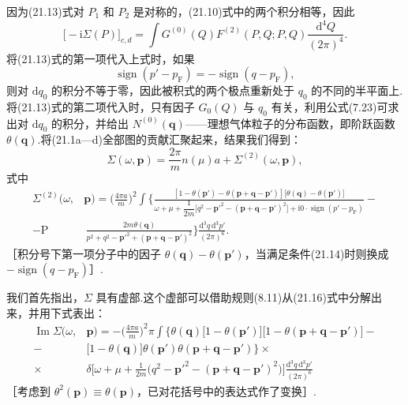 因为(21.13)式对 $P_1$ 和 $P_2$ 是对称的，(21.10)式中的两个积分相等，因此
\begin{equation*}
  \bigl[-\mathrm{i}\Sigma(P)\bigr]_{c,d}=\int G^{(0)}(Q)F^{(2)}(P,Q;P,Q)\frac{\mathrm{d}^4Q}{(2\pi)^4}.
\end{equation*}
将(21.13)式的第一项代入上式时，如果
\begin{equation}
  \operatorname{sign}(p'-p_{\mathrm{F}})=-\operatorname{sign}(q-p_{\mathrm{F}}),
\end{equation}
则对 $\mathrm{d}q_0$ 的积分不等于零，因此被积式的两个极点重新处于 $q_0$ 的不同的半平面上.将(21.13)式的第二项代入时，只有因子 $G_0(Q)$ 与 $q_0$ 有关，利用公式(7.23)可求出对 $\mathrm{d}q_0$ 的积分，并给出 $N^{(0)}(\bm{q})$——理想气体粒子的分布函数，即阶跃函数 $\theta(\bm q)$.将(21.1a—d)全部图的贡献汇聚起来，结果我们得到：
\begin{equation}
  \Sigma(\omega,\bm{p})=\frac{2\pi}{m}n(\mu)a+\Sigma^{(2)}(\omega,\bm{p}),
\end{equation}
式中
\begin{equation}
\begin{aligned}
  \Sigma^{(2)}(\omega,&\bm{p})=\biggl(\frac{4\pi a}{m}\biggr)^{\!2}\int\biggl\{\frac{[1-\theta(\bm{p}')-\theta(\bm{p}+\bm{q}-\bm{p}')]\bigl[\theta(\bm{q})-\theta(\bm{p}')\bigr]}
  {\omega+\mu+\dfrac{1}{2m}\bigl[q^2-\bm{p}'^2-(\bm{p}+\bm{q}-\bm{p}')^2\bigr]+\mathrm{i}0\cdot\operatorname{sign}(p'-p_{\mathrm{F}})}-\\
  -\mathrm{P}&\,\frac{2m\theta(\bm{q})}{p^2+q^2-\bm{p}'^2+(\bm{p}+\bm{q}-\bm{p}')^2}\biggr\}\frac{\mathrm{d}^3q\,\mathrm{d}^3p'}{(2\pi)^6}.
\end{aligned}
\end{equation}
［积分号下第一项分子中的因子 $\theta(\bm{q})-\theta(\bm{p}')$，当满足条件(21.14)时则换成 $-\operatorname{sign}(q-p_{\mathrm{F}})$］.

我们首先指出，$\Sigma$ 具有虚部.这个虚部可以借助规则(8.11)从(21.16)式中分解出来，并用下式表出：
\begin{equation}
\begin{aligned}
  \operatorname{Im}\Sigma(\omega,&\bm{p})=-\biggl(\frac{4\pi a}{m}\biggr)^{\!2}\pi\int\bigl\{\theta(\bm{q})\bigl[1-\theta(\bm{p}')\bigr]\bigl[1-\theta(\bm{p}+\bm{q}-\bm{p}')\bigr]-\\
  -{}&\bigl[1-\theta(\bm{q})\bigr]\theta(\bm{p}')\theta(\bm{p}+\bm{q}-\bm{p}')\bigr\}\times\\
  \times{}&\delta\biggl[\omega+\mu+\frac{1}{2m}\bigl(q^2-\bm{p}'^2-(\bm{p}+\bm{q}-\bm{p}')^2\bigr)\biggr]\frac{\mathrm{d}^3q\,\mathrm{d}^3p'}{(2\pi)^6}
\end{aligned}
\end{equation}
［考虑到 $\theta^2(\bm{p})\equiv\theta(\bm{p})$，已对花括号中的表达式作了变换］.

